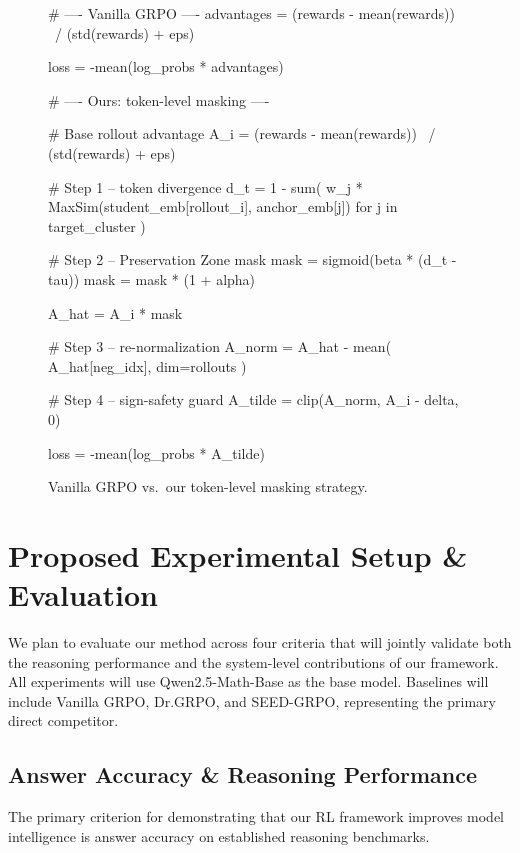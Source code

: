 \documentclass[conference]{IEEEtran}
\begin{document}
\begin{figure}[htbp]
\begin{mintbox}
# ---- Vanilla GRPO ----
advantages = (rewards - mean(rewards)) \
           / (std(rewards) + eps)

loss = -mean(log_probs * advantages)


# ---- Ours: token-level masking ----

# Base rollout advantage
A_i = (rewards - mean(rewards)) \
    / (std(rewards) + eps)

# Step 1 -- token divergence
d_t = 1 - sum(
          w_j * MaxSim(student_emb[rollout_i], anchor_emb[j])
          for j in target_cluster
      )

# Step 2 -- Preservation Zone mask
mask = sigmoid(beta * (d_t - tau))
mask = mask * (1 + alpha)

A_hat = A_i * mask

# Step 3 -- re-normalization
A_norm = A_hat - mean(
             A_hat[neg_idx],
             dim=rollouts
         )

# Step 4 -- sign-safety guard
A_tilde = clip(A_norm, A_i - delta, 0)

loss = -mean(log_probs * A_tilde)
\end{mintbox}
\caption{Vanilla GRPO vs.\ our token-level masking strategy.}
\label{lst:pseudocode}
\end{figure}

\section{Proposed Experimental Setup \& Evaluation}

We plan to evaluate our method across four criteria that will jointly validate both the reasoning performance and the system-level contributions of our framework. All experiments will use Qwen2.5-Math-Base as the base model. Baselines will include Vanilla GRPO, Dr.GRPO, and SEED-GRPO, representing the primary direct competitor.

\subsection{Answer Accuracy \& Reasoning Performance}

The primary criterion for demonstrating that our RL framework improves model intelligence is answer accuracy on established reasoning benchmarks.
\end{document}
